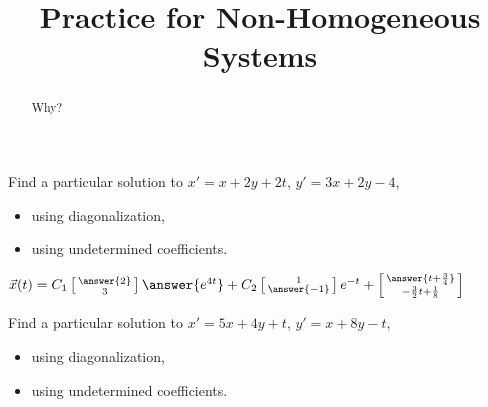 \documentclass{ximera}
\title{Practice for Non-Homogeneous Systems}
\begin{document}
\begin{abstract}
    Why?
\end{abstract}
\maketitle



\begin{exercise}
    Find a particular solution to $x' = x+ 2y +2t$,  $y' = 3x + 2y -4$,
    \begin{itemize}
        \item using diagonalization,
        \item using undetermined coefficients.
    \end{itemize}
    $\vec{x}(t) = C_1\left[\begin{smallmatrix} \answer{2} \\ 3 \end{smallmatrix}\right]\answer{e^{4t}} + C_2\left[\begin{smallmatrix} 1 \\ \answer{-1} \end{smallmatrix}\right]e^{-t} + \left[\begin{smallmatrix} \answer{t + \frac{3}{4}} \\ -\frac{3}{2}t + \frac{1}{8} \end{smallmatrix}\right]$
\end{exercise}

\begin{exercise}%
    Find a particular solution to $x' = 5x + 4y + t$, $y' = x + 8y - t$,
    \begin{itemize}
        \item using diagonalization,
        \item using undetermined coefficients.
    \end{itemize}
\end{exercise}
\end{document}
